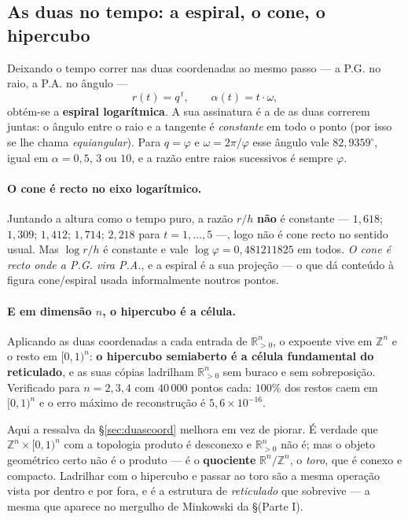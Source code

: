 \documentclass[11pt,a4paper]{article}
\theoremstyle{plain}
\theoremstyle{definition}
\theoremstyle{remark}
\newcommand{\R}{\mathbb{R}}
\newcommand{\Z}{\mathbb{Z}}
\begin{document}
\subsection{As duas no tempo: a espiral, o cone, o hipercubo}\label{sec:dinamica}

Deixando o tempo correr nas duas coordenadas ao mesmo passo --- a P.G. no raio, a P.A. no ângulo ---
\[
  r(t) = q^{\,t}, \qquad \alpha(t) = t\cdot\omega ,
\]
obtém-se a \textbf{espiral logarítmica}. A sua assinatura é a de as duas correrem juntas: o ângulo
entre o raio e a tangente é \emph{constante} em todo o ponto (por isso se lhe chama
\emph{equiangular}). Para $q=\varphi$ e $\omega = 2\pi/\varphi$ esse ângulo vale $82{,}9359^\circ$,
igual em $\alpha = 0{,}5$, $3$ ou $10$, e a razão entre raios sucessivos é sempre $\varphi$.

\paragraph{O cone é recto no eixo logarítmico.} Juntando a altura como o tempo puro, a razão
$r/h$ \textbf{não} é constante --- $1{,}618$; $1{,}309$; $1{,}412$; $1{,}714$; $2{,}218$ para
$t=1,\dots,5$ ---, logo não é cone recto no sentido usual. Mas $\log r / h$ é constante e vale
$\log\varphi = 0{,}481211825$ em todos. \emph{O cone é recto onde a P.G. vira P.A.}, e a espiral é
a sua projeção --- o que dá conteúdo à figura cone/espiral usada informalmente noutros pontos.

\paragraph{E em dimensão $n$, o hipercubo é a célula.} Aplicando as duas coordenadas a cada
entrada de $\R_{>0}^n$, o expoente vive em $\Z^n$ e o resto em $[0,1)^n$: \textbf{o hipercubo
semiaberto é a célula fundamental do reticulado}, e as suas cópias ladrilham $\R_{>0}^n$ sem buraco
e sem sobreposição. Verificado para $n=2,3,4$ com $40\,000$ pontos cada: $100\%$ dos restos caem em
$[0,1)^n$ e o erro máximo de reconstrução é $5{,}6\times10^{-16}$.

Aqui a ressalva da \S\ref{sec:duascoord} melhora em vez de piorar. É verdade que
$\Z^n\times[0,1)^n$ com a topologia produto é desconexo e $\R_{>0}^n$ não é; mas o objeto
geométrico certo não é o produto --- é o \textbf{quociente} $\R^n/\Z^n$, o \emph{toro}, que é
conexo e compacto. Ladrilhar com o hipercubo e passar ao toro são a mesma operação vista por dentro
e por fora, e é a estrutura de \emph{reticulado} que sobrevive --- a mesma que aparece no mergulho
de Minkowski da \S(Parte I).
\end{document}
